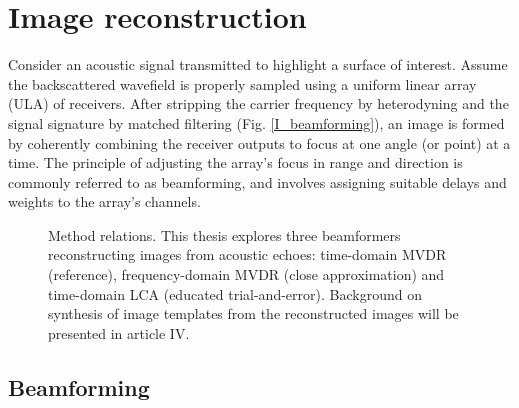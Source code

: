 {%


\section{Image reconstruction}\label{methods}

Consider an acoustic signal transmitted to highlight a surface of interest. Assume the backscattered wavefield is properly sampled using a uniform linear array (ULA) of receivers. After stripping the carrier frequency by heterodyning and the signal signature by matched filtering (Fig. \ref{I_beamforming}), an image is formed by coherently combining the receiver outputs to focus at one angle (or point) at a time. The principle of adjusting the array's focus in range and direction is commonly referred to as beamforming, and involves assigning suitable delays and weights to the array's channels.

\begin{figure}[tp]\label{II_fig_article_relation}
\caption{Method relations. This thesis explores three beamformers reconstructing images from acoustic echoes: time-domain MVDR (reference), frequency-domain MVDR (close approximation) and time-domain LCA (educated trial-and-error). Background on synthesis of image templates from the reconstructed images will be presented in article IV. }
\end{figure}

\subsection{Beamforming}

}
